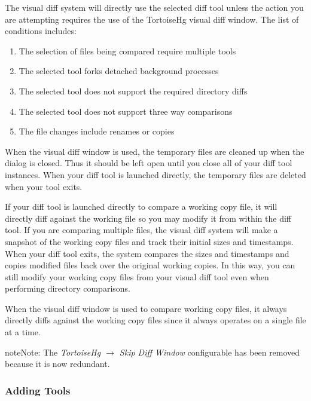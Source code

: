 \documentclass[letterpaper,10pt,english]{manual}
\begin{document}
The visual diff system will directly use the selected diff tool unless
the action you are attempting requires the use of the TortoiseHg visual
diff window.  The list of conditions includes:
\begin{enumerate}
\item {} 
The selection of files being compared require multiple tools

\item {} 
The selected tool forks detached background processes

\item {} 
The selected tool does not support the required directory diffs

\item {} 
The selected tool does not support three way comparisons

\item {} 
The file changes include renames or copies

\end{enumerate}

When the visual diff window is used, the temporary files are cleaned up
when the dialog is closed.  Thus it should be left open until you close
all of your diff tool instances.  When your diff tool is launched
directly, the temporary files are deleted when your tool exits.

If your diff tool is launched directly to compare a working copy file,
it will directly diff against the working file so you may modify it from
within the diff tool.  If you are comparing multiple files, the visual
diff system will make a snapshot of the working copy files and track
their initial sizes and timestamps.  When your diff tool exits, the
system compares the sizes and timestamps and copies modified files back
over the original working copies.  In this way, you can still modify
your working copy files from your visual diff tool even when performing
directory comparisons.

When the visual diff window is used to compare working copy files, it
always directly diffs against the working copy files since it always
operates on a single file at a time.

\begin{notice}{note}{Note:}
The \emph{TortoiseHg \(\rightarrow\) Skip Diff Window} configurable
has been removed because it is now redundant.
\end{notice}


\subsubsection{Adding Tools}
\end{document}
